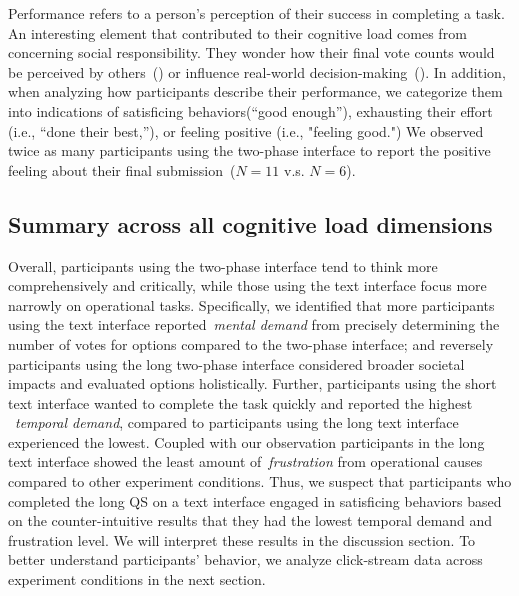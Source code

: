 Performance refers to a person's perception of their success in completing a task. An interesting element that contributed to their cognitive load comes from concerning social responsibility. They wonder how their final vote counts would be perceived by others~() or influence real-world decision-making~(). In addition, when analyzing how participants describe their performance, we categorize them into indications of satisficing behaviors(``good enough''), exhausting their effort (i.e., ``done their best,''), or feeling positive (i.e., "feeling good.") We observed twice as many participants using the two-phase interface to report the positive feeling about their final submission~($N=11$ v.s. $N=6$).

\subsection{Summary across all cognitive load dimensions}
Overall, participants using the two-phase interface tend to think more comprehensively and critically, while those using the text interface focus more narrowly on operational tasks. Specifically, we identified that more participants using the text interface reported~\textit{mental demand} from precisely determining the number of votes for options compared to the two-phase interface; and reversely participants using the long two-phase interface considered broader societal impacts and evaluated options holistically. Further, participants using the short text interface wanted to complete the task quickly and reported the highest ~\textit{temporal demand}, compared to participants using the long text interface experienced the lowest. Coupled with our observation participants in the long text interface showed the least amount of~\textit{frustration} from operational causes compared to other experiment conditions. Thus, we suspect that participants who completed the long QS on a text interface engaged in satisficing behaviors based on the counter-intuitive results that they had the lowest temporal demand and frustration level. We will interpret these results in the discussion section. To better understand participants' behavior, we analyze click-stream data across experiment conditions in the next section.

